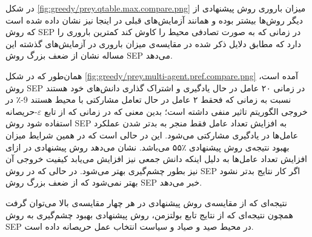 در شکل
\ref{fig:greedy/prey.qtable.max.compare.png}
میزان باروری روش پیشنهادی از دیگر روش‌ها بیشتر بوده و همانند آزمایش‌های قبلی در اینجا نیز نشان داده شده است که روش SEP در زمانی که به صورت تصادفی محیط را کاوش کند کمترین باروری را دارد که مطابق دلایل ذکر شده در مقایسه‌ی میزان باروری در آزمایش‌های گذشته این مساله نشان از ضعف بزرگ روش SEP می‌دهد.


 همان‌طور که در شکل
\ref{fig:greedy/prey.multi-agent.pref.compare.png}
آمده است، روش SEP در زمانی ۲۰ عامل در حال یادگیری و اشتراک گذاری دانش‌های خود هستند نسبت به زمانی که فحقط ۲ عامل در حال تعامل مشارکتی با محیط هستند 9-٪ در خروجی الگوریتم تاثیر منفی داشته است؛ بدین معنی که در زمانی که از تابع $\varepsilon$-حریصانه استفاده شود روش SEP به افزایش تعداد عامل فقط منجر به بدتر شدن عملکرد عامل‌ها در یادگیری مشارکتی می‌شود. این در حالی است که در همین شرایط میزان بهبود نتیجه‌ی روش پیشنهادی ٪۵۵ می‌باشد. نشان می‌دهد روش پیشنهادی در ازای افزایش تعداد عامل‌ها به دلیل اینکه دانش جمعی نیز افزایش می‌یابد کیفیت خروجی آن نیز بطور چشم‌گیری بهتر می‌شود. در حالی که در روش SEP اگر کار نتایج بدتر نشود بهتر نمی‌شود که از ضعف بزرگ روش SEP خبر می‌دهد.


 نتیجه‌ای که از مقایسه‌ی روش پیشنهادی در هر چهار مقایسه‌ی بالا می‌توان گرفت همچون نتیجه‌ای که از نتایج تابع بولتزمن، روش پیشنهادی بهبود چشم‌گیری به روش SEP در محیط صید و صیاد و سیاست انتخاب عمل حریصانه داده است.